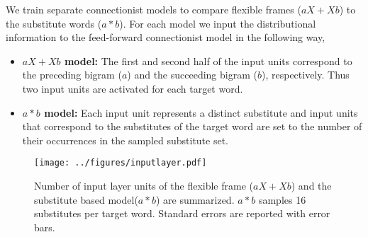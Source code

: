 We train separate connectionist models to compare flexible frames ($aX+Xb$) to
the substitute words ($a*b$).  For each model we input the distributional
information to the feed-forward connectionist model in the following way,

\begin{itemize}
\item {\bf$aX+Xb$ model:} The first and second half of the input units
  correspond to the preceding bigram ($a$) and the succeeding bigram
  ($b$), respectively.  Thus two input units are activated for each
  target word.
\item {\bf $a*b$ model:} Each input unit represents a distinct
  substitute and input units that correspond to the substitutes of the
  target word are set to the number of their occurrences in the
  sampled substitute set.
\end{itemize}

\begin{figure}[ht]
  \centering
  \texttt{[image: ../figures/inputlayer.pdf]}
  \caption{Number of input layer units of the flexible frame ($aX + Xb$) and
    the substitute based model($a*b$) are summarized.  $a*b$ samples 16
    substitutes per target word.  Standard errors are reported with error bars. 
  }
  \label{fig:inputunits}
\end{figure}

